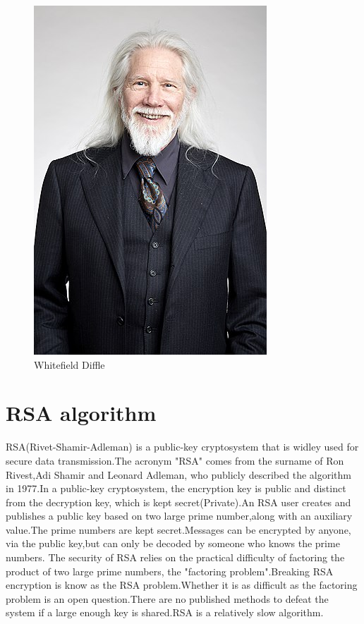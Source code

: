 \documentclass{article}
\begin{document}
\begin{figure}[hb]
  \hfill
  \begin{minipage}[hb]{0.3\textwidth}
    \includegraphics[width=\textwidth]{Diffle.jpg}
    \caption{Whitefield Diffle}
  \end{minipage}
\end{figure}

\section{RSA algorithm}
RSA(Rivet-Shamir-Adleman) is a public-key cryptosystem that is widley used for secure data transmission.The acronym "RSA" comes from the surname of Ron Rivest,Adi Shamir and Leonard Adleman, who publicly described the algorithm in 1977.In a public-key cryptosystem, the encryption key is public and distinct from the decryption key, which is kept secret(Private).An RSA user creates and publishes a public key based on two large prime number,along with an auxiliary value.The prime numbers are kept secret.Messages can be encrypted by anyone, via the public key,but can only be decoded by someone who knows the prime numbers.
The security of RSA relies on the practical difficulty of factoring the product of two large prime numbers, the "factoring problem".Breaking RSA encryption is know as the RSA problem.Whether it is as difficult as the factoring problem is an open question.There are no published methods to defeat the system if a large enough key is shared.RSA is a relatively slow algorithm.
\end{document}

